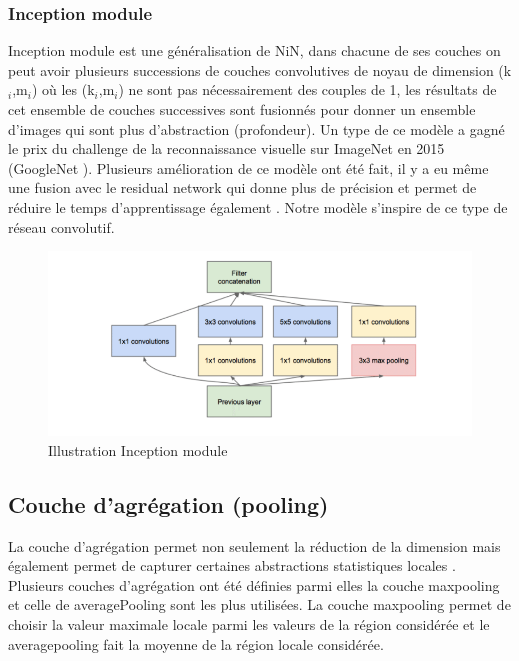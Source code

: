 \subsubsection{Inception module}
Inception module\cite{im1, im2, im3, im4} est une généralisation de NiN, dans chacune de ses couches on peut avoir plusieurs successions de couches convolutives de noyau de dimension (k$_i$,m$_i$) où les (k$_i$,m$_i$) ne sont pas nécessairement des couples de 1, les résultats de cet ensemble de couches successives sont fusionnés pour donner un ensemble d'images qui sont plus d'abstraction (profondeur). Un type de ce modèle a gagné le prix du challenge de la reconnaissance visuelle sur ImageNet en 2015 (GoogleNet \cite{im1}). Plusieurs amélioration de ce modèle ont été fait, il y a eu même une fusion avec le residual network qui donne plus de précision et permet de réduire le temps d'apprentissage également \cite{im1, im2, im3, im4}. Notre modèle s'inspire de ce type de réseau convolutif. 

\begin{figure}[H]
    \centering
    \includegraphics[scale = 0.5]{images/im.png}
    \caption{Illustration Inception module}
\end{figure}

\subsection{Couche d'agrégation (pooling)}
La couche d'agrégation permet non seulement la réduction de la dimension mais également permet de capturer certaines abstractions statistiques locales \cite{pool1, pool2, pool3, pool4}. Plusieurs couches d'agrégation ont été définies parmi elles la couche maxpooling et celle de averagePooling sont les plus utilisées. La couche maxpooling permet de choisir la valeur maximale locale parmi les valeurs de la région considérée et le averagepooling fait la moyenne de la région locale considérée.

